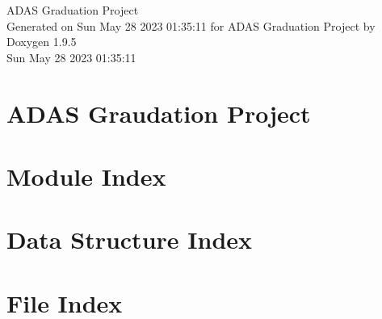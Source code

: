 \documentclass[twoside]{book}
\newcommand{\+}{\discretionary{\mbox{\scriptsize$\hookleftarrow$}}{}{}}
\newcommand{\clearemptydoublepage}{%
    \newpage{\pagestyle{empty}\cleardoublepage}%
  }
\begin{document}
  \raggedbottom
    \hypersetup{pageanchor=false,
                bookmarksnumbered=true,
                pdfencoding=unicode
               }
  \begin{titlepage}
  \vspace*{7cm}
  \begin{center}%
  {\Large ADAS Graduation Project}\\
  \vspace*{1cm}
  {\large Generated on Sun May 28 2023 01\+:35\+:11 for ADAS Graduation Project by Doxygen 1.9.5}\\
    \vspace*{0.5cm}
    {\small Sun May 28 2023 01:35:11}
  \end{center}
  \end{titlepage}
  \clearemptydoublepage
  \tableofcontents
  \clearemptydoublepage
  \hypersetup{pageanchor=true}
\chapter{ADAS Graudation Project}
\label{index}\hypertarget{index}{}
\chapter{Module Index}

\chapter{Data Structure Index}

\chapter{File Index}

\end{document}
